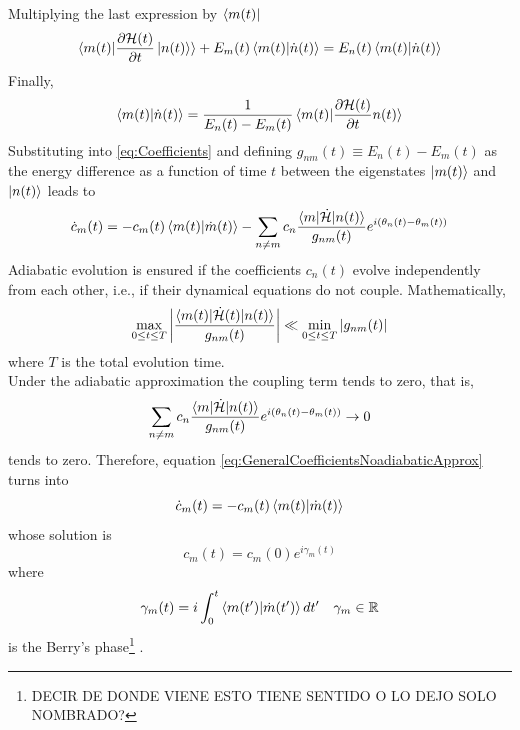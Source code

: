 Multiplying the last expression by $\bra{m(t)}$ 
\begin{equation}
    \braket{m(t)|\frac{\partial\mathcal{H}(t)}{\partial t}\ket{n(t)}} + E_{m}(t)\braket{m(t)|\dot{n}(t)} = E_{n}(t)\braket{m(t)|\dot{n}(t)}
\end{equation}
Finally,
\begin{equation}
    \braket{m(t)|\dot{n}(t)} = \frac{1}{E_{n}(t)-E_{m}(t)}\braket{m(t)|\frac{\partial \mathcal{H}(t)}{\partial t}n(t)}
\end{equation}
Substituting into \ref{eq:Coefficients} and defining $g_{nm}(t)\equiv E_{n}(t) - E_{m}(t)$ as the energy difference as a function of time $t$ between the eigenstates $\ket{m(t)}$ and $\ket{n(t)}$ leads to
\begin{equation}
\label{eq:GeneralCoefficientsNoadiabaticApprox}
    \dot{c}_{m}(t) = -c_{m}(t) \braket{m(t)|\dot{m}(t)} - \sum_{n\neq m} c_{n}\frac{\braket{m|\dot{\mathcal{H}}|n(t)}}{g_{nm}(t)}e^{i\left(\theta_{n}(t) - \theta_{m}(t)\right)}
\end{equation}
Adiabatic evolution is ensured if the coefficients $c_{n}(t)$ evolve independently from each other, i.e., if their dynamical equations do not couple. Mathematically,
\begin{equation}
    \max_{0 \leq t \leq T} \abs{\frac{\braket{m(t)|\dot{\mathcal{H}}(t)|n(t)}}{g_{nm}(t)}} \ll \min_{0\leq t \leq T} \abs{g_{nm}(t)}
\end{equation}
where $T$ is the total evolution time.\\ 
Under the adiabatic approximation the coupling term tends to zero, that is,
\begin{equation}
    \sum_{n\neq m} c_{n}\frac{\braket{m|\dot{\mathcal{H}}|n(t)}}{g_{nm}(t)}e^{i\left(\theta_{n}(t) - \theta_{m}(t)\right)} \to 0
\end{equation}
tends to zero. Therefore, equation \ref{eq:GeneralCoefficientsNoadiabaticApprox} turns into
\begin{equation}
    \dot{c}_{m}(t) = -c_{m}(t)\braket{m(t)|\dot{m}(t)}
\end{equation}
whose solution is
\begin{equation}
    c_{m}(t) = c_{m}(0)e^{i\gamma_{m}(t)}
\end{equation}
where
\begin{equation}
    \gamma_{m}(t) = i\int_{0}^{t}\braket{m(t^{\prime})|\dot{m}(t^{\prime})}dt^{\prime} \quad \gamma_{m}\in \mathbb{R}
\end{equation}
is the Berry's phase\footnote{DECIR DE DONDE VIENE ESTO TIENE SENTIDO O LO DEJO SOLO NOMBRADO?}   .
